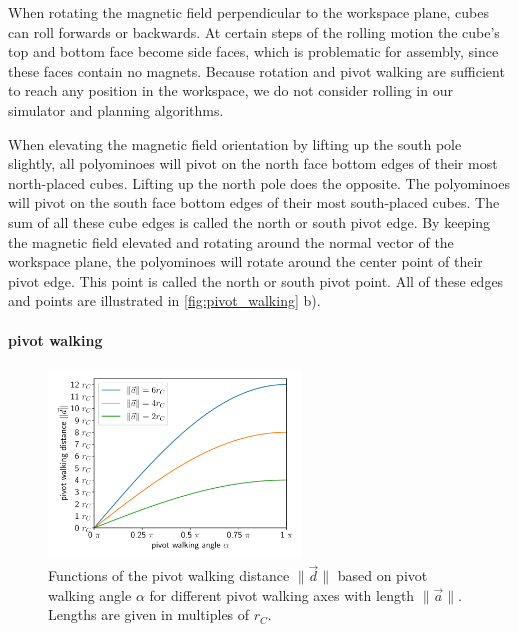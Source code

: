When rotating the magnetic field perpendicular to the workspace plane, cubes can roll forwards or backwards.
At certain steps of the rolling motion the cube's top and bottom face become side faces, which is problematic for assembly, since these faces contain no magnets.
Because rotation and pivot walking are sufficient to reach any position in the workspace, we do not consider rolling in our simulator and planning algorithms.

When elevating the magnetic field orientation by lifting up the south pole slightly, all polyominoes will pivot on the north face bottom edges of their most north-placed cubes.
Lifting up the north pole does the opposite. The polyominoes will pivot on the south face bottom edges of their most south-placed cubes.
The sum of all these cube edges is called the north or south pivot edge.
By keeping the magnetic field elevated and rotating around the normal vector of the workspace plane, the polyominoes will rotate around the center point of their pivot edge.
This point is called the north or south pivot point.
All of these edges and points are illustrated in \autoref{fig:pivot_walking} b).


\paragraph{pivot walking}

\begin{figure}
	\centering
	\includegraphics[width=0.60\textwidth]{figures/plots/pivot_walking_angle.pdf}
	\caption[Functions of $\lVert \vec{d} \rVert$ based on $\alpha$ for different $\lVert \vec{a} \rVert$]{Functions of the pivot walking distance $\lVert \vec{d} \rVert$ based on pivot walking angle $\alpha$ for different pivot walking axes with length $\lVert \vec{a} \rVert$. Lengths are given in multiples of $r_C$.}
	\label{fig:pw_angle_plot}
\end{figure}

